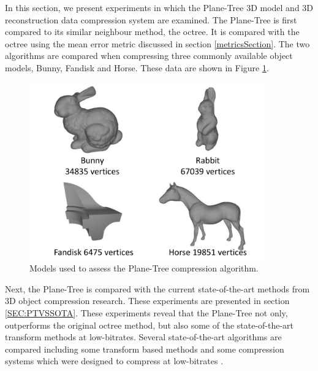 
In this section, we present experiments in which the Plane-Tree 3D model and 3D reconstruction data compression system are examined. The Plane-Tree is first compared to its similar neighbour method, the octree. It is compared with the octree using the mean error metric discussed in section \ref{metricsSection}. The two algorithms are compared when compressing three commonly available object models, Bunny, Fandisk and Horse. These data are shown in Figure \ref{fig:MODELSUSEDA}. \\

\begin{figure}[!htb]
\centering
\includegraphics[width=4.0in]{images/experiments/test_data/modelsused}
\caption{Models used to assess the Plane-Tree compression algorithm.}
\label{fig:MODELSUSEDA}
\end{figure}


Next, the Plane-Tree is compared with the current state-of-the-art methods from 3D object compression research. These experiments are presented in section \ref{SEC:PTVSSOTA}. These experiments reveal that the Plane-Tree not only, outperforms the original octree method, but also some of the state-of-the-art transform methods at low-bitrates. Several state-of-the-art algorithms are compared including some transform based methods \cite{Bayazit103DMesh,Khodakovsky00Progressive} and some compression systems which were designed to compress at low-bitrates \cite{Peng10Feature}. \\ 

